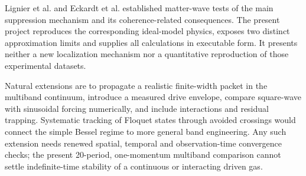 \documentclass[11pt,oneside]{report}
\numberwithin{equation}{chapter}
\begin{document}
Lignier et al. and Eckardt et al. established matter-wave tests of the main suppression mechanism and its coherence-related consequences. The present project reproduces the corresponding ideal-model physics, exposes two distinct approximation limits and supplies all calculations in executable form. It presents neither a new localization mechanism nor a quantitative reproduction of those experimental datasets.

Natural extensions are to propagate a realistic finite-width packet in the multiband continuum, introduce a measured drive envelope, compare square-wave with sinusoidal forcing numerically, and include interactions and residual trapping. Systematic tracking of Floquet states through avoided crossings would connect the simple Bessel regime to more general band engineering. Any such extension needs renewed spatial, temporal and observation-time convergence checks; the present 20-period, one-momentum multiband comparison cannot settle indefinite-time stability of a continuous or interacting driven gas.

\appendix
\end{document}
